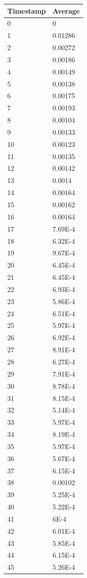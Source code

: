 %
%
\begin{tabular}{|l||l|}
\hline
	\textbf{Timestamp} & \textbf{Average} \\ \hline
	0 & 0 \\ \hline
	1 & 0.01286 \\ \hline
	2 & 0.00272 \\ \hline
	3 & 0.00186 \\ \hline
	4 & 0.00149 \\ \hline
	5 & 0.00138 \\ \hline
	6 & 0.00175 \\ \hline
	7 & 0.00193 \\ \hline
	8 & 0.00104 \\ \hline
	9 & 0.00133 \\ \hline
	10 & 0.00123 \\ \hline
	11 & 0.00135 \\ \hline
	12 & 0.00142 \\ \hline
	13 & 0.0014 \\ \hline
	14 & 0.00164 \\ \hline
	15 & 0.00162 \\ \hline
	16 & 0.00164 \\ \hline
	17 & 7.69E-4 \\ \hline
	18 & 6.32E-4 \\ \hline
	19 & 9.67E-4 \\ \hline
	20 & 6.45E-4 \\ \hline
	21 & 6.45E-4 \\ \hline
	22 & 6.93E-4 \\ \hline
	23 & 5.86E-4 \\ \hline
	24 & 6.51E-4 \\ \hline
	25 & 5.97E-4 \\ \hline
	26 & 6.92E-4 \\ \hline
	27 & 8.91E-4 \\ \hline
	28 & 6.27E-4 \\ \hline
	29 & 7.91E-4 \\ \hline
	30 & 8.78E-4 \\ \hline
	31 & 8.15E-4 \\ \hline
	32 & 5.14E-4 \\ \hline
	33 & 5.97E-4 \\ \hline
	34 & 8.19E-4 \\ \hline
	35 & 5.97E-4 \\ \hline
	36 & 5.67E-4 \\ \hline
	37 & 6.15E-4 \\ \hline
	38 & 0.00102 \\ \hline
	39 & 5.25E-4 \\ \hline
	40 & 5.22E-4 \\ \hline
	41 & 6E-4 \\ \hline
	42 & 6.01E-4 \\ \hline
	43 & 5.85E-4 \\ \hline
	44 & 6.15E-4 \\ \hline
	45 & 5.26E-4 \\ \hline
\end{tabular}
